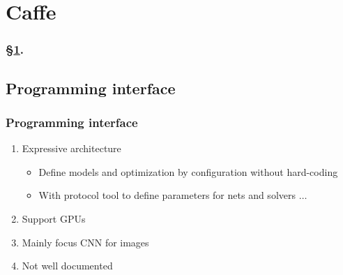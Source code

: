 
\section{Caffe}\label{sec:Caffe}


\frameinlbffalse

\begin{frame}[plain]
\frametitle{\S\ref{sec:Caffe}. \insertsection}
\listofframes
\end{frame}
\addtocounter{framenumber}{-1} %

\frameinlbftrue

\subsection{Programming interface}

\begin{frame}
  \MyLogo
  \frametitle{Programming interface}  

\begin{enumerate}
\item Expressive architecture 
\begin{itemize}
\item Define models and optimization by configuration without hard-coding
\item With protocol tool to define parameters for nets and solvers $\ldots$
\end{itemize}
\item Support GPUs 
\item Mainly focus CNN for images
\item Not well documented
\end{enumerate}
\end{frame}

